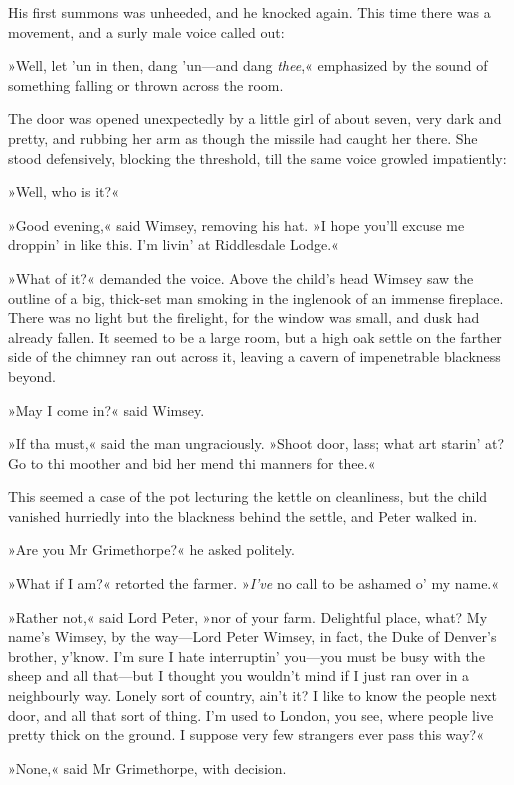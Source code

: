 His first summons was unheeded, and he knocked again. This time there was a movement, and a surly male voice called out:

»Well, let 'un in then, dang 'un—and dang \textit{thee},« emphasized by the sound of something falling or thrown across the room.

The door was opened unexpectedly by a little girl of about seven, very dark and pretty, and rubbing her arm as though the missile had caught her there. She stood defensively, blocking the threshold, till the same voice growled impatiently:

»Well, who is it?«

»Good evening,« said Wimsey, removing his hat. »I hope you'll excuse me droppin' in like this. I'm livin' at Riddlesdale Lodge.«

»What of it?« demanded the voice. Above the child's head Wimsey saw the outline of a big, thick-set man smoking in the inglenook of an immense fireplace. There was no light but the firelight, for the window was small, and dusk had already fallen. It seemed to be a large room, but a high oak settle on the farther side of the chimney ran out across it, leaving a cavern of impenetrable blackness beyond.

»May I come in?« said Wimsey.

»If tha must,« said the man ungraciously. »Shoot door, lass; what art starin' at? Go to thi moother and bid her mend thi manners for thee.«

This seemed a case of the pot lecturing the kettle on cleanliness, but the child vanished hurriedly into the blackness behind the settle, and Peter walked in.

»Are you Mr Grimethorpe?« he asked politely.

»What if I am?« retorted the farmer. »\textit{I've} no call to be ashamed o' my name.«

»Rather not,« said Lord Peter, »nor of your farm. Delightful place, what? My name's Wimsey, by the way—Lord Peter Wimsey, in fact, the Duke of Denver's brother, y'know. I'm sure I hate interruptin' you—you must be busy with the sheep and all that—but I thought you wouldn't mind if I just ran over in a neighbourly way. Lonely sort of country, ain't it? I like to know the people next door, and all that sort of thing. I'm used to London, you see, where people live pretty thick on the ground. I suppose very few strangers ever pass this way?«

»None,« said Mr Grimethorpe, with decision.

